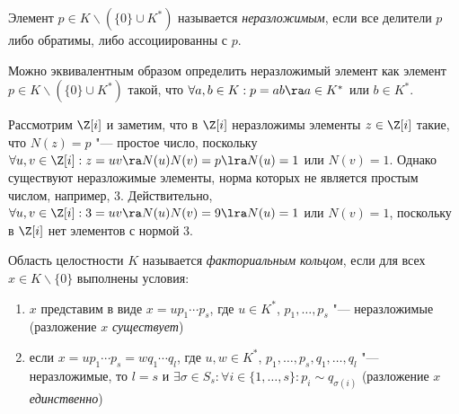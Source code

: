 \begin{definition}
	Элемент $p \in K \backslash (\{0\} \cup K^*)$ называется \textit{неразложимым}, если все делители $p$ либо обратимы, либо ассоциированны с $p$.
\end{definition}

\begin{note}
	Можно эквивалентным образом определить неразложимый элемент как элемент $p \in K \backslash (\{0\} \cup K^*)$ такой, что $\forall a, b \in K: p = ab \ra a \in K^*$ или $b \in K^*$.
\end{note}

\begin{example}
	Рассмотрим $\Z[i]$ и заметим, что в $\Z[i]$ неразложимы элементы $z \in \Z[i]$ такие, что $N(z) = p$ "--- простое число, поскольку $\forall u, v \in \Z[i]: z = uv \ra N(u)N(v) = p \lra N(u) = 1$ или $N(v) = 1$. Однако существуют неразложимые элементы, норма которых не является простым числом, например, 3. Действительно, $\forall u, v \in \Z[i]: 3 = uv \ra N(u)N(v) = 9 \lra N(u) = 1$ или $N(v) = 1$, поскольку в $\Z[i]$ нет элементов с нормой 3.
\end{example}

\begin{definition}
	Область целостности $K$ называется \textit{факториальным кольцом}, если для всех $x \in K \backslash \{0\}$ выполнены условия:
	\begin{enumerate}
		\item $x$ представим в виде $x = up_1\dotsm p_s$, где $u \in K^*$, $p_1, \dotsc, p_s$ "--- неразложимые (разложение $x$ \textit{существует})
		\item если $x = up_1\dotsm p_s = wq_1 \dotsm q_l$, где $u, w \in K^*$, $p_1, \dotsc, p_s, q_1, \dotsc, q_l$ "--- неразложимые, то $l = s$ и $\exists \sigma \in S_s: \forall i \in \{1, \dotsc, s\}: p_i \sim q_{\sigma(i)}$ (разложение $x$ \textit{единственно})
	\end{enumerate}
\end{definition}

